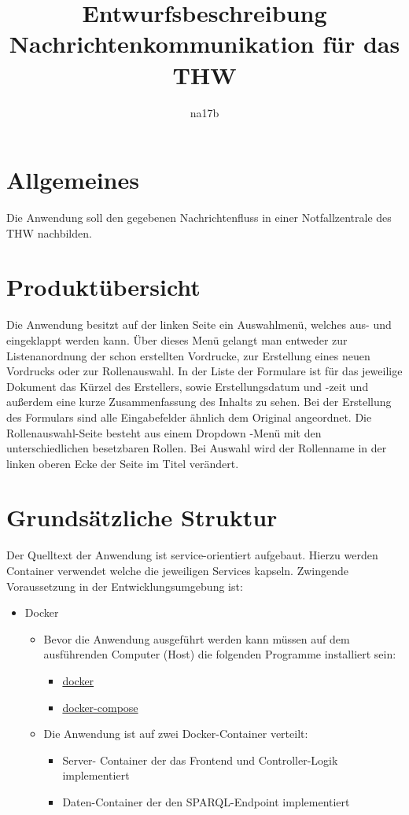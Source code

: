 \documentclass[a4paper,11pt,oneside, titlepage]{article}
\title{Entwurfsbeschreibung\\Nachrichtenkommunikation für das THW}
\author{na17b}
\date{}
\begin{document}
\maketitle


\tableofcontents


\newpage


\section{Allgemeines}
Die Anwendung soll den gegebenen Nachrichtenfluss in einer Notfallzentrale des THW nachbilden.
\section{Produktübersicht}
Die Anwendung besitzt auf der linken Seite ein Auswahlmenü, welches aus- und eingeklappt werden kann. Über dieses Menü gelangt man entweder zur Listenanordnung der schon erstellten Vordrucke, zur Erstellung eines neuen Vordrucks oder zur Rollenauswahl. In der Liste der Formulare ist für das jeweilige Dokument das Kürzel des Erstellers, sowie Erstellungsdatum und -zeit und außerdem eine kurze Zusammenfassung des Inhalts zu sehen. Bei der Erstellung des Formulars sind alle Eingabefelder ähnlich dem Original angeordnet. Die Rollenauswahl-Seite besteht aus einem Dropdown -Menü mit den unterschiedlichen besetzbaren Rollen. Bei Auswahl wird der Rollenname in der linken oberen Ecke der Seite im Titel verändert.
\section{Grundsätzliche Struktur}
Der Quelltext der Anwendung ist service-orientiert aufgebaut. Hierzu werden Container verwendet welche die jeweiligen Services kapseln. Zwingende Voraussetzung in der Entwicklungsumgebung ist: 
\begin{itemize}
	\item Docker
	\begin{itemize}
		\item Bevor die Anwendung ausgeführt werden kann müssen auf dem ausführenden Computer (Host) die folgenden Programme installiert sein:
		\begin{itemize}
			\item \href{https://www.docker.com/get-docker}{docker}
			\item \href{https://docs.docker.com/compose/}{docker-compose} 
		\end{itemize}
		\item Die Anwendung ist auf zwei Docker-Container verteilt:
		\begin{itemize}
			\item Server-
			Container der das Frontend und Controller-Logik implementiert
			\item Daten-Container der den SPARQL-Endpoint implementiert
		\end{itemize}
		
	\end{itemize}	
\end{itemize}
\end{document}

